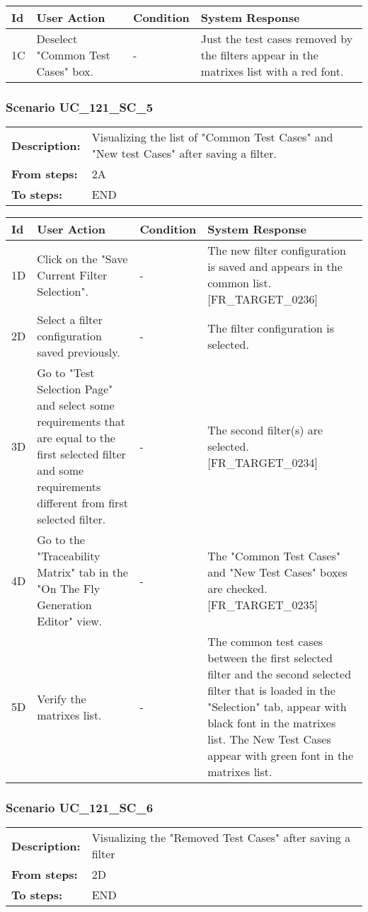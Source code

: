 \documentclass[a4paper,11pt]{article}
\newcommand{\bl}{\\ \hline}
\begin{document}
\begin{tabular}{|p{0.8in}|p{1.6in}|p{1.6in}|p{1.6in}|}
\hline
Id & User Action & Condition & System Response  \bl 
1C & Deselect "Common Test Cases" box. & - & Just the test cases removed by the filters appear in the matrixes list with a red font. \bl 
\end{tabular}
\subsubsection*{Scenario UC_121_SC_5}
\begin{tabular}{p{1in}p{4in}}
{\bf Description:} & Visualizing the list of "Common Test Cases" and "New test Cases" after saving a filter. \\
{\bf From steps:} & 2A \\
{\bf To steps:} & END \\
\end{tabular}
 
\begin{tabular}{|p{0.8in}|p{1.6in}|p{1.6in}|p{1.6in}|}
\hline
Id & User Action & Condition & System Response  \bl 
1D & Click on the "Save Current Filter Selection". & - & The new filter configuration is saved and appears in the common list. [FR_TARGET_0236] \bl 
2D & Select a filter configuration saved previously. & - & The filter configuration is selected. \bl 
3D & Go to "Test Selection Page" and select some requirements that are equal to the first selected filter and some requirements different from first selected filter. & - & The second filter(s) are selected. [FR_TARGET_0234] \bl 
4D & Go to the "Traceability Matrix" tab in the "On The Fly Generation Editor" view. & - & The "Common Test Cases" and "New Test Cases" boxes are checked. [FR_TARGET_0235] \bl 
5D & Verify the matrixes list. & - & The common test cases between the first selected filter and the second selected filter that is loaded in the "Selection" tab, appear with black font in the matrixes list. The New Test Cases appear with green font in the matrixes list. \bl 
\end{tabular}
\subsubsection*{Scenario UC_121_SC_6}
\begin{tabular}{p{1in}p{4in}}
{\bf Description:} & Visualizing the "Removed Test Cases" after saving a filter \\
{\bf From steps:} & 2D \\
{\bf To steps:} & END \\
\end{tabular}
 
\end{document}
